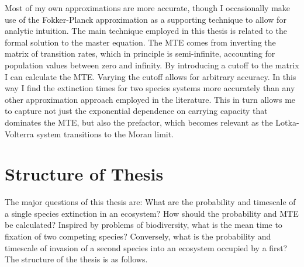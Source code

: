 %
Most of my own approximations are more accurate, though I occasionally make use of the Fokker-Planck approximation as a supporting technique to allow for analytic intuition. 
The main technique employed in this thesis is related to the formal solution to the master equation. 
The MTE comes from inverting the matrix of transition rates, which in principle is semi-infinite, accounting for population values between zero and infinity. 
By introducing a cutoff to the matrix I can calculate the MTE. 
Varying the cutoff allows for arbitrary accuracy. 
In this way I find the extinction times for two species systems more accurately than any other approximation approach employed in the literature. 
This in turn allows me to capture not just the exponential dependence on carrying capacity that dominates the MTE, but also the prefactor, which becomes relevant as the Lotka-Volterra system transitions to the Moran limit. 





\section{Structure of Thesis}

The major questions of this thesis are: What are the probability and timescale of a single species extinction in an ecosystem? How should the probability and MTE be calculated? Inspired by problems of biodiversity, what is the mean time to fixation of two competing species? Conversely, what is the probability and timescale of invasion of a second species into an ecosystem occupied by a first? 
The structure of the thesis is as follows. 

